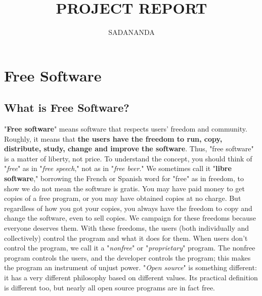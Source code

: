 \documentclass[6pt,a4paper]{report}
\author{SADANANDA}
\title{PROJECT REPORT}
\begin{document}
\maketitle
\chapter{Free Software}
\section*{What is Free Software?}
"\textbf{Free software}" means software that respects users' freedom and community. Roughly, it
means that \textbf{the users have the freedom to run, copy, distribute, study, change and improve
the software}. Thus, "free software" is a matter of liberty, not price. To understand the concept, you
should think of "\textit{free}" as in "\textit{free speech}," not as in "\textit{free beer}." We
sometimes call it "\textbf{libre software}," borrowing the French or Spanish word for "free" as in
freedom, to show we do not mean the software is gratis.
You may have paid money to get copies of a free program, or you may have obtained copies at no
charge. But regardless of how you got your copies, you always have the freedom to copy and change
the software, even to sell copies.
We campaign for these freedoms because everyone deserves them. With these freedoms, the users
(both individually and collectively) control the program and what it does for them. When users don't
control the program, we call it a "\textit{nonfree}" or "\textit{proprietary}" program. The nonfree
program controls the users, and the developer controls the program; this makes the program an
instrument of unjust power.
"\emph{Open source}" is something different: it has a very different philosophy based on different
values. Its practical definition is different too, but nearly all open source programs are in fact free.
\end{document}

